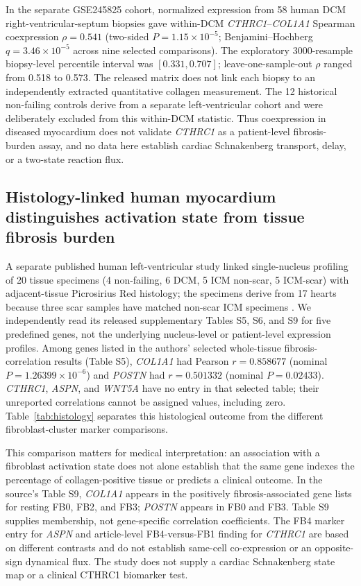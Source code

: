 \documentclass[preprint,11pt]{elsarticle}
\newcommand{\cthrc}{\textit{CTHRC1}}
\begin{document}
In the separate GSE245825 cohort, normalized expression from 58 human DCM right-ventricular-septum biopsies gave within-DCM \cthrc{}--\textit{COL1A1} Spearman coexpression $\rho=0.541$ (two-sided $P=1.15\times10^{-5}$; Benjamini--Hochberg $q=3.46\times10^{-5}$ across nine selected comparisons). The exploratory 3000-resample biopsy-level percentile interval was $[0.331,0.707]$; leave-one-sample-out $\rho$ ranged from 0.518 to 0.573. The released matrix does not link each biopsy to an independently extracted quantitative collagen measurement. The 12 historical non-failing controls derive from a separate left-ventricular cohort and were deliberately excluded from this within-DCM statistic. Thus coexpression in diseased myocardium does not validate \cthrc{} as a patient-level fibrosis-burden assay, and no data here establish cardiac Schnakenberg transport, delay, or a two-state reaction flux.

\subsection{Histology-linked human myocardium distinguishes activation state from tissue fibrosis burden}
A separate published human left-ventricular study linked single-nucleus profiling of 20 tissue specimens (4 non-failing, 6 DCM, 5 ICM non-scar, 5 ICM-scar) with adjacent-tissue Picrosirius Red histology; the specimens derive from 17 hearts because three scar samples have matched non-scar ICM specimens \cite{Youness2025}. We independently read its released supplementary Tables S5, S6, and S9 for five predefined genes, not the underlying nucleus-level or patient-level expression profiles. Among genes listed in the authors' selected whole-tissue fibrosis-correlation results (Table S5), \textit{COL1A1} had Pearson $r=0.858677$ (nominal $P=1.26399\times10^{-6}$) and \textit{POSTN} had $r=0.501332$ (nominal $P=0.02433$). \cthrc{}, \textit{ASPN}, and \textit{WNT5A} have no entry in that selected table; their unreported correlations cannot be assigned values, including zero. Table~\ref{tab:histology} separates this histological outcome from the different fibroblast-cluster marker comparisons.

This comparison matters for medical interpretation: an association with a fibroblast activation state does not alone establish that the same gene indexes the percentage of collagen-positive tissue or predicts a clinical outcome. In the source's Table S9, \textit{COL1A1} appears in the positively fibrosis-associated gene lists for resting FB0, FB2, and FB3; \textit{POSTN} appears in FB0 and FB3. Table S9 supplies membership, not gene-specific correlation coefficients. The FB4 marker entry for \textit{ASPN} and article-level FB4-versus-FB1 finding for \cthrc{} are based on different contrasts and do not establish same-cell co-expression or an opposite-sign dynamical flux. The study does not supply a cardiac Schnakenberg state map or a clinical CTHRC1 biomarker test.
\end{document}
